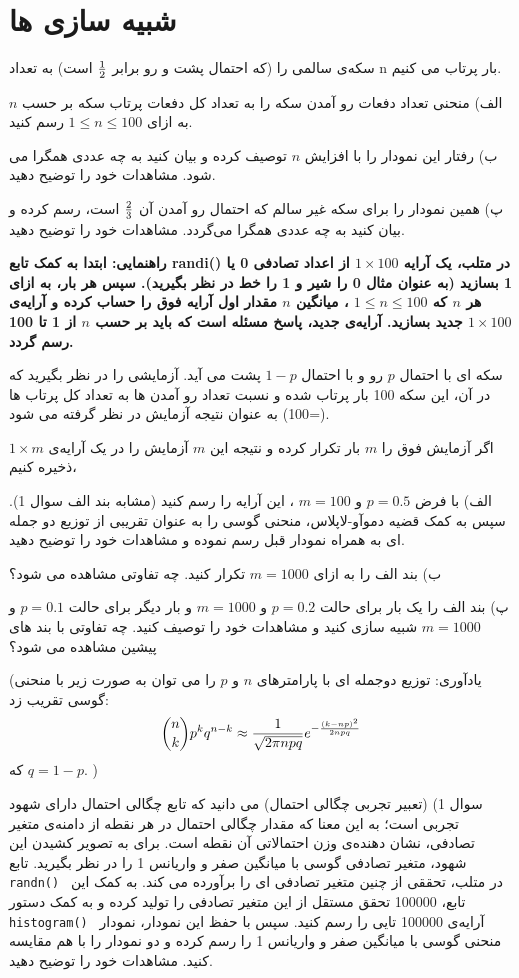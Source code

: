 \chapter{شبیه سازی ها}

\Q
سکه‌ی سالمی را (که احتمال پشت و رو برابر $1\over 2$ است) به تعداد n بار پرتاب می کنیم.

الف) منحنی تعداد دفعات رو آمدن سکه را به تعداد کل دفعات پرتاب سکه بر حسب $n$ به ازای $1\le n\le 100$ رسم کنید.

ب) رفتار این نمودار را با افزایش $n$ توصیف کرده و بیان کنید به چه عددی همگرا می شود. مشاهدات خود را توضیح دهید.

پ) همین نمودار را برای سکه غیر سالم که احتمال رو آمدن آن
$
{2\over 3}
$
است،  رسم کرده و بیان کنید به چه عددی همگرا می‌گردد. مشاهدات خود را توضیح دهید.

\textbf{
راهنمایی: ابتدا به کمک تابع 
randi()
در متلب، یک آرایه 
$1\times 100$
 از اعداد تصادفی 0 یا 1 بسازید (به عنوان مثال 0 را شیر و 1 را خط در نظر بگیرید). سپس هر بار، به ازای هر $n$ که
$1\le n \le 100$
، 
میانگین
$n$
 مقدار اول آرایه فوق را حساب کرده و آرایه‌ی $1\times 100$ جدید بسازید. آرایه‌ی جدید، پاسخ مسئله است که باید بر حسب $n$ از 1 تا 100 رسم گردد.
}



\Q
سکه ای با احتمال $p$ رو و با احتمال $1-p$ پشت می آید. آزمایشی را در نظر بگیرید که در آن، این سکه 100 بار پرتاب شده و نسبت تعداد رو آمدن ها به تعداد کل پرتاب ها (=100) به عنوان نتیجه آزمایش در نظر گرفته می شود.

اگر آزمایش فوق را $m$ بار تکرار کرده و نتیجه این $m$ آزمایش را در یک آرایه‌ی 
$
1\times m
$
 ذخیره کنیم،

الف) با فرض 
$
p=0.5
$
و
$
m=100
$
، این آرایه را رسم کنید (مشابه بند الف سوال 1). سپس به کمک قضیه دموآو-لاپلاس، منحنی گوسی را به عنوان تقریبی از توزیع دو جمله ای به همراه نمودار قبل رسم نموده و مشاهدات خود را توضیح دهید.

ب) بند الف را به ازای $m=1000$ تکرار کنید. چه تفاوتی مشاهده می شود؟

پ) بند الف را یک بار برای حالت 
$
p=0.2
$
و
$
m=1000
$
و بار دیگر برای حالت 
$
p=0.1
$
و
$
m=1000
$
شبیه سازی کنید و مشاهدات خود را توصیف کنید. چه تفاوتی با بند های پیشین مشاهده می شود؟

(یادآوری: توزیع دوجمله ای با پارامترهای $n$ و $p$ را می توان به صورت زیر با منحنی گوسی تقریب زد:
$$
\binom{n}{k}p^kq^{n-k}\approx {1\over\sqrt{2\pi npq}}e^{-{(k-np)^2\over 2npq}}
$$
که 
$
q=1-p
$.
)

\Q
سوال 1) (تعبیر تجربی چگالی احتمال) می دانید که تابع چگالی احتمال دارای شهود تجربی است؛ به این معنا که مقدار چگالی احتمال در هر نقطه از دامنه‌ی متغیر تصادفی، نشان دهنده‌ی وزن احتمالاتی آن نقطه است. برای به تصویر کشیدن این شهود، متغیر تصادفی گوسی با میانگین صفر و واریانس 1 را در نظر بگیرید. تابع
\texttt{
randn()
}
در متلب، تحققی از چنین متغیر تصادفی ای را برآورده می کند. به کمک این تابع، 100000 تحقق مستقل از این متغیر تصادفی را تولید کرده و به کمک دستور 
\texttt{
histogram()
}
آرایه‌ی 100000 تایی را رسم کنید. سپس با حفظ این نمودار، نمودار منحنی گوسی با میانگین صفر و واریانس 1 را رسم کرده و دو نمودار را با هم مقایسه کنید. مشاهدات خود را توضیح دهید.

